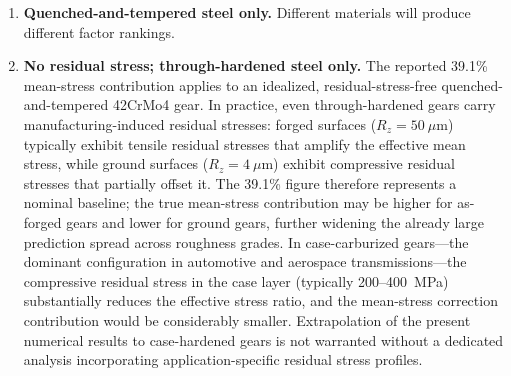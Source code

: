 \documentclass[12pt,a4paper]{article}
\begin{document}
\begin{enumerate}
        I caution that the narrow bootstrap CIs for the dominant factors
        quantify \emph{sampling} variability conditional on the observed
        censoring pattern, not the \emph{identifiability} of the
        underlying parameters. At 64\% censoring, the likelihood surface
        may possess shallow local maxima or flat ridges that bootstrap
        resampling cannot detect because each bootstrap replicate
        inherits the same censoring structure. The numerical variance
        fractions for the three dominant factors (39.1\%, 35.3\%,
        23.5\%) should therefore be interpreted as the best available
        point estimates under the log-normal AFT specification, not as
        uniquely identified values. Their qualitative ranking
        (MS $>$ Std $>$ Rz) is robust across all bootstrap replicates
        and sensitivity analyses reported in this study. The S--N
        curve source ($-0.7$\%) and cumulative damage rule (0.3\%) are
        below the noise floor of the 64\%-censored design and should
        not be assigned physical interpretation.
  \item \textbf{Quenched-and-tempered steel only.} Different materials
        will produce different factor rankings.
  \item \textbf{No residual stress; through-hardened steel only.} The
        reported 39.1\% mean-stress contribution applies to an idealized,
        residual-stress-free quenched-and-tempered 42CrMo4 gear. In
        practice, even through-hardened gears carry manufacturing-induced
        residual stresses: forged surfaces ($R_z=50~\mu$m) typically
        exhibit tensile residual stresses that amplify the effective mean
        stress, while ground surfaces ($R_z=4~\mu$m) exhibit compressive
        residual stresses that partially offset it. The 39.1\% figure
        therefore represents a nominal baseline; the true mean-stress
        contribution may be higher for as-forged gears and lower for
        ground gears, further widening the already large prediction spread
        across roughness grades. In case-carburized gears---the dominant
        configuration in automotive and aerospace transmissions---the
        compressive residual stress in the case layer (typically
        200--400~MPa) substantially reduces the effective stress ratio,
        and the mean-stress correction contribution would be considerably
        smaller. Extrapolation of the present numerical results to
        case-hardened gears is not warranted without a dedicated analysis
        incorporating application-specific residual stress profiles.

\end{enumerate}
\end{document}
